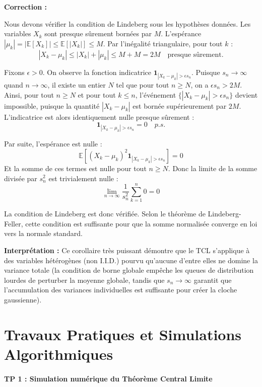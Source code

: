 \documentclass[11pt,a4paper]{article}
\begin{document}
\textbf{Correction :}

Nous devons vérifier la condition de Lindeberg sous les hypothèses données.
Les variables $X_k$ sont presque sûrement bornées par $M$.
L'espérance $|\mu_k| = |\mathbb{E}[X_k]| \le \mathbb{E}[|X_k|] \le M$.
Par l'inégalité triangulaire, pour tout $k$ :
$$|X_k - \mu_k| \le |X_k| + |\mu_k| \le M + M = 2M \quad \text{presque sûrement}.$$

Fixons $\epsilon > 0$.
On observe la fonction indicatrice $\mathbf{1}_{|X_k - \mu_k| > \epsilon s_n}$.
Puisque $s_n \to \infty$ quand $n \to \infty$, il existe un entier $N$ tel que pour tout $n \ge N$, on a $\epsilon s_n > 2M$.
Ainsi, pour tout $n \ge N$ et pour tout $k \le n$, l'événement $\{|X_k - \mu_k| > \epsilon s_n\}$ devient impossible, puisque la quantité $|X_k - \mu_k|$ est bornée supérieurement par $2M$.
L'indicatrice est alors identiquement nulle presque sûrement :
$$\mathbf{1}_{|X_k - \mu_k| > \epsilon s_n} = 0 \quad p.s.$$

Par suite, l'espérance est nulle :
$$\mathbb{E}\left[ (X_k - \mu_k)^2 \mathbf{1}_{|X_k - \mu_k| > \epsilon s_n} \right] = 0$$
Et la somme de ces termes est nulle pour tout $n \ge N$.
Donc la limite de la somme divisée par $s_n^2$ est trivialement nulle :
$$\lim_{n \to \infty} \frac{1}{s_n^2} \sum_{k=1}^n 0 = 0$$

La condition de Lindeberg est donc vérifiée.
Selon le théorème de Lindeberg-Feller, cette condition est suffisante pour que la somme normalisée converge en loi vers la normale standard.

\textbf{Interprétation :}
Ce corollaire très puissant démontre que le TCL s'applique à des variables hétérogènes (non I.I.D.) pourvu qu'aucune d'entre elles ne domine la variance totale (la condition de borne globale empêche les queues de distribution lourdes de perturber la moyenne globale, tandis que $s_n \to \infty$ garantit que l'accumulation des variances individuelles est suffisante pour créer la cloche gaussienne).


\vspace{1cm}
\newpage
\part{Travaux Pratiques et Simulations Algorithmiques}

\subsection*{TP 1 : Simulation numérique du Théorème Central Limite}
\end{document}
